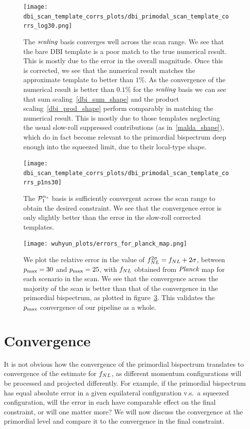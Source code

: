 \begin{figure}[!pth]
\centering
\texttt{[image: dbi\_scan\_template\_corrs\_plots/dbi\_primodal\_scan\_template\_corrs\_log30.png]}
\caption{
    The $\textit{scaling}$ basis converges well across the scan range.
    We see that the bare DBI template is a poor match to the true numerical result.
    This is mostly due to the error in the overall magnitude.
    Once this is corrected, we see that the numerical result matches the
    approximate template to better than $1\%$. As the convergence of the
    numerical result is better than $0.1\%$ for the $\textit{scaling}$ basis
    we can see that sum scaling~\eqref{dbi_sum_shape} and the
    product scaling~\eqref{dbi_prod_shape} perform
    comparably in matching the numerical result. This is mostly
    due to those templates neglecting the usual slow-roll suppressed
    contributions (as in~\eqref{malda_shape}),
    which do in fact become relevant to the primordial
    bispectrum deep enough into the squeezed limit, due to their local-type shape.
}\label{fig:dbi_primodal_scan_template_corrs_log30}
\end{figure}
\begin{figure}[!pth]
\centering
\texttt{[image: dbi\_scan\_template\_corrs\_plots/dbi\_primodal\_scan\_template\_corrs\_p1ns30]}
\caption{
    The $\mathcal{P}^{n_s}_1$ basis is sufficiently convergent across the scan range
    to obtain the desired constraint.
    We see that the convergence error is only slightly better than the error
    in the slow-roll corrected templates.
}\label{fig:dbi_primodal_scan_template_corrs_p1ns}
\end{figure}
\begin{figure}[!pth]
\centering
\texttt{[image: wuhyun\_plots/errors\_for\_planck\_map.png]}
\caption{
    We plot the relative error in the value of $f_{NL}^{2\sigma}=f_{NL}+2\sigma$,
    between $p_\text{max}=30$ and $p_\text{max}=25$,
    with $f_{NL}$ obtained from $\textit{Planck}$ map for each scenario in the scan.
    We see that the convergence across the majority of the scan is better than that of the
    convergence in the primordial bispectrum, as plotted in figure~\ref{fig:dbi_primodal_scan_template_corrs_p1ns}.
    This validates the $p_\text{max}$ convergence of our pipeline as a whole.
}\label{fig:dbi_primodal_scan_template_corrs_p1ns}
\end{figure}


\section{Convergence}
    It is not obvious how the convergence of the primordial bispectrum translates to
    convergence of the estimate for $f_{NL}$, as different
    momentum configurations will be processed and projected differently.
    For example, if the primordial bispectrum has equal absolute error in a given
    equilateral configuration v.s.\ a squeezed configuration, will the error in
    each have comparable effect on the final constraint, or will one matter more?
    We will now discuss the convergence at the primordial level and compare it to
    the convergence in the final constraint.


